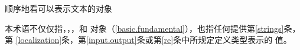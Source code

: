 顺序地看可以表示文本的对象

\begin{note}[\noindent]
本术语不仅仅指，，，和
对象（\ref{basic.fundamental}），也指任何提供第\ref{strings}条，第
\ref{localization}条，第\ref{input.output}条或第\ref{re}条中所规定定义类型表示的
值。
\end{note}
